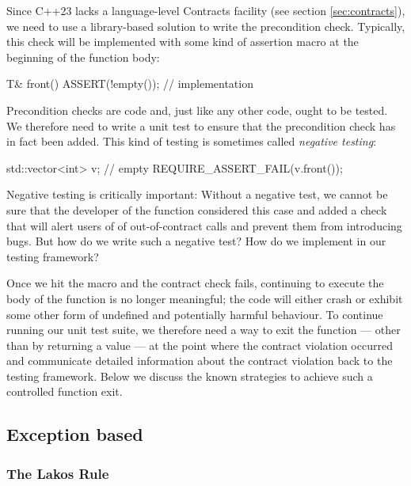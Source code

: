 Since C++23 lacks a language-level Contracts facility (see section \ref{sec:contracts}), we need to use a library-based solution to write the precondition check. Typically, this check will be implemented with some kind of assertion macro at the beginning of the function body:
\begin{codeblock}
T& front() {
  ASSERT(!empty());
  // implementation
}
\end{codeblock}


Precondition checks are code and, just like any other code, ought to be tested. We therefore need to write a unit test to ensure that the precondition check has in fact been added. This kind of testing is sometimes called \emph{negative testing}:

\begin{codeblock}
std::vector<int> v;  // empty
REQUIRE_ASSERT_FAIL(v.front());
\end{codeblock}
Negative testing is critically important: Without a negative test, we cannot be sure that the developer of the  function considered this case and added a check that will alert users of  of out-of-contract calls and prevent them from introducing bugs. %
But how do we write such a negative test? How do we implement  in our testing framework?

Once we hit the  macro and the contract check fails, continuing to execute the body of the function is no longer meaningful; the code will either crash or exhibit some other form of undefined and potentially harmful behaviour. To continue running our unit test suite, we therefore need a way to exit the function --- other than by returning a value --- at the point where the contract violation occurred and communicate detailed information about the contract violation back to the testing framework. Below we discuss the known strategies to achieve such a controlled function exit.

\subsection{Exception based}

\subsubsection{The Lakos Rule}

